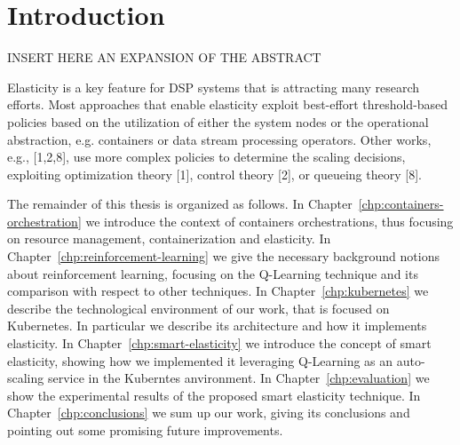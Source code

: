 \chapter{Introduction}
\label{chp:introduction}


INSERT HERE AN EXPANSION OF THE ABSTRACT


Elasticity is a key feature for DSP systems that is attracting many research efforts. 
%
Most approaches that enable elasticity exploit best-effort threshold-based policies based on the utilization of either the system nodes or the operational abstraction, e.g. containers or data stream processing operators.
%
Other works, e.g., [1,2,8], use more complex policies to determine the scaling decisions, exploiting optimization theory [1], control theory [2], or queueing theory [8].


The remainder of this thesis is organized as follows.
%
In Chapter~\ref{chp:containers-orchestration} we introduce the context of containers orchestrations, thus focusing on resource management, containerization and elasticity.
%
In Chapter~\ref{chp:reinforcement-learning} we give the necessary background notions about reinforcement learning, focusing on the Q-Learning technique and its comparison with respect to other techniques.
%
In Chapter~\ref{chp:kubernetes} we describe the technological environment of our work, that is focused on Kubernetes. In particular we describe its architecture and how it implements elasticity.
%
In Chapter~\ref{chp:smart-elasticity} we introduce the concept of smart elasticity, showing how we implemented it leveraging Q-Learning as an auto-scaling service in the Kuberntes anvironment.
%
In Chapter~\ref{chp:evaluation} we show the experimental results of the proposed smart elasticity technique.
%
In Chapter~\ref{chp:conclusions} we sum up our work, giving its conclusions and pointing out some promising future improvements.
